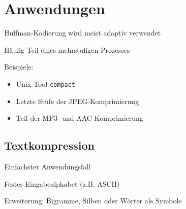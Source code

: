 \documentclass[xcolor=dvipsnames,presentation]{beamer}    %
\newenvironment{witemize}{\itemize\setlength{\itemsep}{1em}}{\enditemize}
\begin{document}
\begin{frame}{\insertsubsection}
\begin{figure}
\centering
{}
\end{figure}
\end{frame}

\section{Anwendungen}

\begin{frame}{\insertsection}
  \begin{witemize}
  \item Huffman-Kodierung wird meist adaptiv verwendet
  \item Häufig Teil eines mehrstufigen Prozesses
  \item Beispiele:
    \begin{itemize}
    \item Unix-Tool {\tt{compact}}
    \item Letzte Stufe der JPEG-Komprimierung
    \item Teil der MP3- und AAC-Komprimierung
    \end{itemize}
  \end{witemize}
\end{frame}

\subsection{Textkompression}

\begin{frame}{\insertsubsection}
  \begin{witemize}
  \item Einfachster Anwendungsfall
  \item Festes Eingabealphabet (z.B. ASCII)
  \item Erweiterung: Bigramme, Silben oder Wörter als Symbole
  \end{witemize}
\end{frame}
\end{document}
